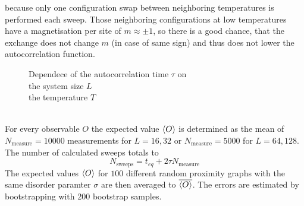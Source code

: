 because only one configuration swap between neighboring temperatures is
performed each sweep. Those neighboring configurations at low temperatures
have a magnetisation per site of \(m \approx \pm 1\), so there is a good
chance, that the exchange does not change \(m\) (in case of same sign)
and thus does not lower the autocorrelation function.
\begin{figure}[htbp]
    \centering
    \caption[The autocorrelation time $\tau$]
    {
        Dependece of the autocorrelation time $\tau$ on\\
         the system size $L$\\
         the temperature $T$
    }
    \label{fig:autocorr}
\end{figure}\\
For every observable \(O\) the expected value \(\left< O \right>\) is determined
as the mean of \(N_{\mathrm{measure}}=10000\) measurements for \(L=16,32\)
or \(N_{\mathrm{measure}}=5000\) for \(L=64,128\). The number of
calculated sweeps totals to
\[N_{\mathrm{sweeps}}=t_{eq}+2\tau N_{\mathrm{measure}}\]
The expected values \(\left< O \right>\) for \(100\) different random proximity
graphs with the same disorder paramter \(\sigma\) are then averaged to
\(\overline{\left< O \right>}\).
The errors are estimated by bootstrapping \cite{Bootstrap} with 200
bootstrap samples.

